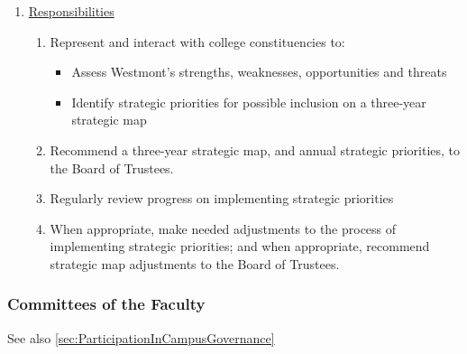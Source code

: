 \begin{enumerate}
					\item{\underline{Responsibilities}
						\begin{enumerate}
							\item{Represent and interact with college constituencies to:
								\begin{itemize}
									\item{ Assess Westmont's strengths, weaknesses,
										opportunities and threats}
									\item{ Identify strategic priorities for
										possible inclusion on a three-year strategic
										map}
								\end{itemize}
							}
							\item{ Recommend a three-year strategic map, and annual
								strategic priorities, to the Board of Trustees.}
							\item{ Regularly review progress on implementing
								strategic priorities}
							\item{ When appropriate, make needed adjustments to the
								process of implementing strategic priorities; and when
								appropriate, recommend strategic map adjustments to the
								Board of Trustees.}
						\end{enumerate}
					}
				\end{enumerate}
		\subsubsection{Committees of the Faculty}
			\label{sec:CommitteesOfTheFaculty}
			See also
			\ref{sec:ParticipationInCampusGovernance}


